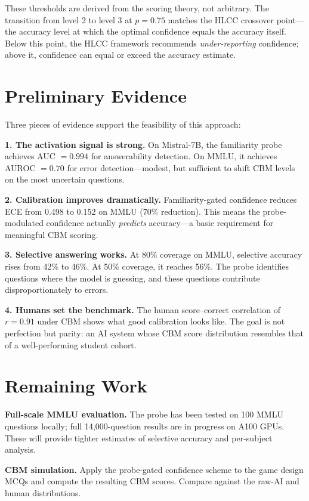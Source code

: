 \documentclass[11pt,a4paper]{article}
\begin{document}
These thresholds are derived from the scoring theory, not arbitrary.
The transition from level 2 to level 3 at $p = 0.75$ matches the HLCC crossover point---the accuracy level at which the optimal confidence equals the accuracy itself.
Below this point, the HLCC framework recommends \emph{under-reporting} confidence; above it, confidence can equal or exceed the accuracy estimate.

\section{Preliminary Evidence}

Three pieces of evidence support the feasibility of this approach:

\textbf{1. The activation signal is strong.}
On Mistral-7B, the familiarity probe achieves AUC $= 0.994$ for answerability detection.
On MMLU, it achieves AUROC $= 0.70$ for error detection---modest, but sufficient to shift CBM levels on the most uncertain questions.

\textbf{2. Calibration improves dramatically.}
Familiarity-gated confidence reduces ECE from 0.498 to 0.152 on MMLU (70\% reduction).
This means the probe-modulated confidence actually \emph{predicts} accuracy---a basic requirement for meaningful CBM scoring.

\textbf{3. Selective answering works.}
At 80\% coverage on MMLU, selective accuracy rises from 42\% to 46\%.
At 50\% coverage, it reaches 56\%.
The probe identifies questions where the model is guessing, and these questions contribute disproportionately to errors.

\textbf{4. Humans set the benchmark.}
The human score--correct correlation of $r = 0.91$ under CBM shows what good calibration looks like.
The goal is not perfection but parity: an AI system whose CBM score distribution resembles that of a well-performing student cohort.

\section{Remaining Work}

\textbf{Full-scale MMLU evaluation.}
The probe has been tested on 100 MMLU questions locally; full 14,000-question results are in progress on A100 GPUs.
These will provide tighter estimates of selective accuracy and per-subject analysis.

\textbf{CBM simulation.}
Apply the probe-gated confidence scheme to the game design MCQs and compute the resulting CBM scores.
Compare against the raw-AI and human distributions.
\end{document}
